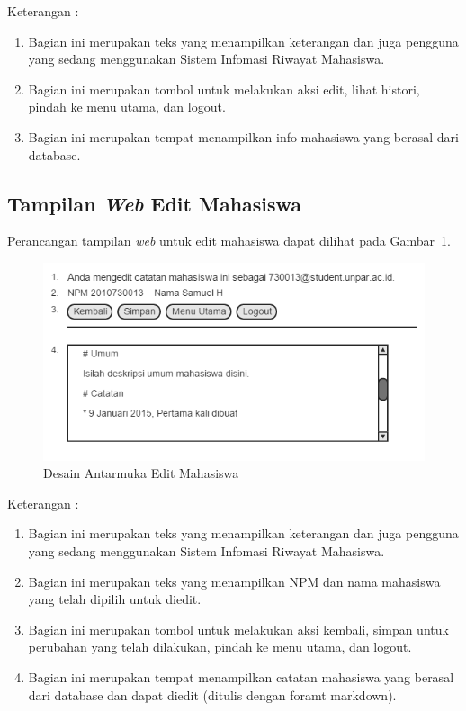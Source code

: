 Keterangan :
\begin{enumerate}[(1)]
\item
Bagian ini merupakan teks yang menampilkan keterangan dan juga pengguna yang sedang menggunakan Sistem Infomasi Riwayat Mahasiswa.
\item
Bagian ini merupakan tombol untuk melakukan aksi edit, lihat histori, pindah
ke menu utama, dan logout.
\item
Bagian ini merupakan tempat menampilkan info mahasiswa yang berasal dari database.
\end{enumerate}

\subsection{Tampilan {\it Web} Edit Mahasiswa}
Perancangan tampilan {\it web} untuk edit mahasiswa dapat dilihat pada Gambar~\ref{fig:editmahasiswa}.
\begin{figure}[H]
\centering
\includegraphics[scale=0.5]{Gambar/editmahasiswa.png}
\caption[Desain Antarmuka Edit Mahasiswa]{Desain Antarmuka Edit Mahasiswa}
\label{fig:editmahasiswa}
\end{figure}

Keterangan :
\begin{enumerate}[(1)]
\item
Bagian ini merupakan teks yang menampilkan keterangan dan juga pengguna yang
sedang menggunakan Sistem Infomasi Riwayat Mahasiswa.
\item
Bagian ini merupakan teks yang menampilkan NPM dan nama mahasiswa yang telah
dipilih untuk diedit.
\item
Bagian ini merupakan tombol untuk melakukan aksi kembali, simpan untuk perubahan
yang telah dilakukan, pindah ke menu utama, dan logout.
\item
Bagian ini merupakan tempat menampilkan catatan mahasiswa yang berasal dari
database dan dapat diedit (ditulis dengan foramt markdown).
\end{enumerate}


